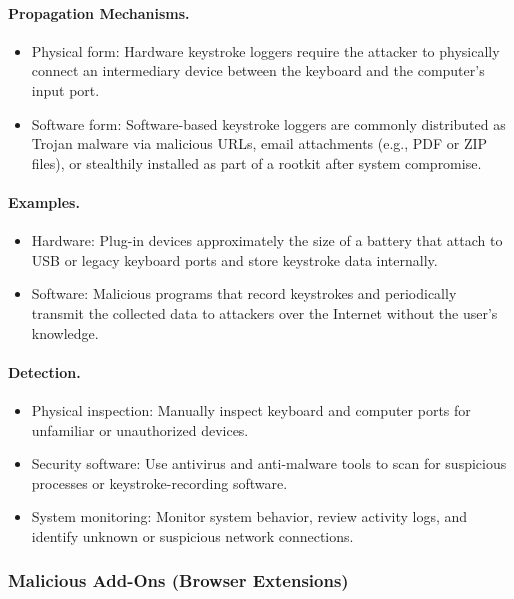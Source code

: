 \paragraph{Propagation Mechanisms.}
\begin{itemize}
  \item Physical form: Hardware keystroke loggers require the attacker to physically connect an intermediary device between the keyboard and the computer's input port.
  \item Software form: Software-based keystroke loggers are commonly distributed as Trojan malware via malicious URLs, email attachments (e.g., PDF or ZIP files), or stealthily installed as part of a rootkit after system compromise.
\end{itemize}

\paragraph{Examples.}
\begin{itemize}
  \item Hardware: Plug-in devices approximately the size of a battery that attach to USB or legacy keyboard ports and store keystroke data internally.
  \item Software: Malicious programs that record keystrokes and periodically transmit the collected data to attackers over the Internet without the user's knowledge.
\end{itemize}

\paragraph{Detection.}
\begin{itemize}
  \item Physical inspection: Manually inspect keyboard and computer ports for unfamiliar or unauthorized devices.
  \item Security software: Use antivirus and anti-malware tools to scan for suspicious processes or keystroke-recording software.
  \item System monitoring: Monitor system behavior, review activity logs, and identify unknown or suspicious network connections.
\end{itemize}

\subsubsection{Malicious Add-Ons (Browser Extensions)}


